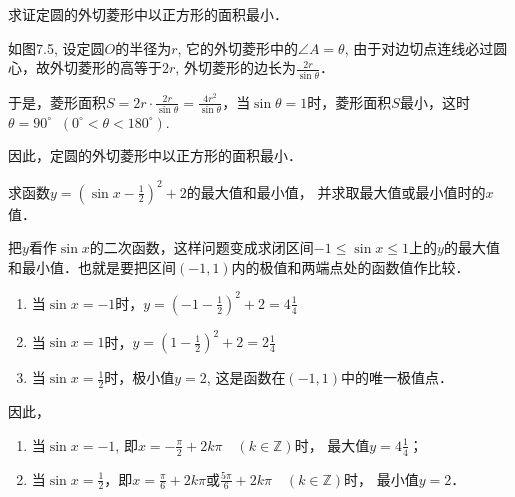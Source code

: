 \begin{example}
    求证定圆的外切菱形中以正方形的面积最小．
\end{example}

\begin{solution}
如图7.5, 设定圆$O$的半径为$r$, 它的外切菱形中的$\angle A=\theta$, 由于对边切点连线必过圆心，故外切菱形的高等于$2r$, 外切菱形的边长为$\frac{2r}{\sin\theta}$．

\begin{figure}[htp]
    \centering
    \caption{}
\end{figure}

    于是，菱形面积$S=2r\cdot \frac{2r}{\sin\theta}=\frac{4r^2}{\sin\theta}$，当$\sin\theta=1$时，菱形面积$S$最小，这时$\theta=90^{\circ}\;\;(0^{\circ}<\theta<180^{\circ})$.
    
因此，定圆的外切菱形中以正方形的面积最小．
\end{solution}

\begin{example}
求函数$y=\left(\sin x-\frac{1}{2}\right)^2+2$的最大值和最小值，
并求取最大值或最小值时的$x$值．
\end{example}

\begin{solution}
    把$y$看作$\sin x$的二次函数，这样问题变成求闭区间$-1\le \sin x\le 1$上的$y$的最大值和最小值．也就是要把区间$(-1, 1)$内的极值和两端点处的函数值作比较．

\begin{enumerate}
    \item 当$\sin x=-1$时，$y=\left(-1-\frac{1}{2}\right)^2+2=4\frac{1}{4}$
    \item 当$\sin x=1$时，$y=\left(1-\frac{1}{2}\right)^2+2=2\frac{1}{4}$
    \item 当$\sin x=\frac{1}{2}$时，极小值$y=2$, 这是函数在$(-1, 1)$中的唯一极值点．
\end{enumerate}

因此，
\begin{enumerate}
    \item 当$\sin x=-1$, 即$x=-\frac{\pi}{2}+2k\pi\quad (k\in\mathbb{Z})$时，
最大值$y=4\frac{1}{4}$；
\item 当$\sin x=\frac{1}{2}$，即$x=\frac{\pi}{6}+2k\pi$或$\frac{5\pi}{6}+2k\pi \quad (k\in\mathbb{Z})$时，
最小值$y=2$．
\end{enumerate}


\end{solution}


